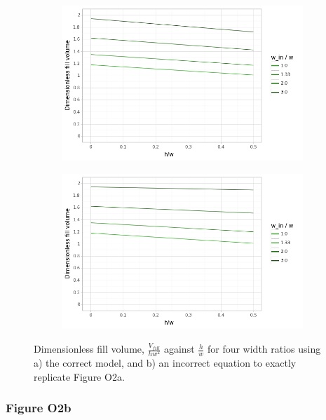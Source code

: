 \begin{figure}[ht]
  \centering
  \begin{subfigure}[b]{0.4\linewidth}
    \includegraphics[width=\linewidth]{../figures/fig_2a.png}
    \caption{}
    \label{fig2a}
  \end{subfigure}
  \begin{subfigure}[b]{0.4\linewidth}
    \includegraphics[width=\linewidth]{../figures/fig_2a_incorrect.png}
    \caption{}
    \label{fig2a_bad}
  \end{subfigure}
  \caption{Dimensionless fill volume, $\frac{V_{fill}}{hw^2}$ against $\frac{h}{w}$
  for four width ratios using a) the correct model, and b) an
  incorrect equation to exactly replicate Figure O2a.}
\end{figure}

\subsubsection{Figure O2b}

